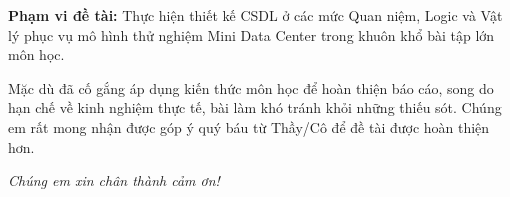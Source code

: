 \textbf{Phạm vi đề tài:} Thực hiện thiết kế CSDL ở các mức Quan niệm, Logic và Vật lý phục vụ mô hình thử nghiệm Mini Data Center trong khuôn khổ bài tập lớn môn học.

\vspace{0.4em}
Mặc dù đã cố gắng áp dụng kiến thức môn học để hoàn thiện báo cáo, song do hạn chế về kinh nghiệm thực tế, bài làm khó tránh khỏi những thiếu sót. Chúng em rất mong nhận được góp ý quý báu từ Thầy/Cô để đề tài được hoàn thiện hơn.

\vspace{0.4em}
\begin{raggedleft}
\textit{Chúng em xin chân thành cảm ơn!}\\
\end{raggedleft}